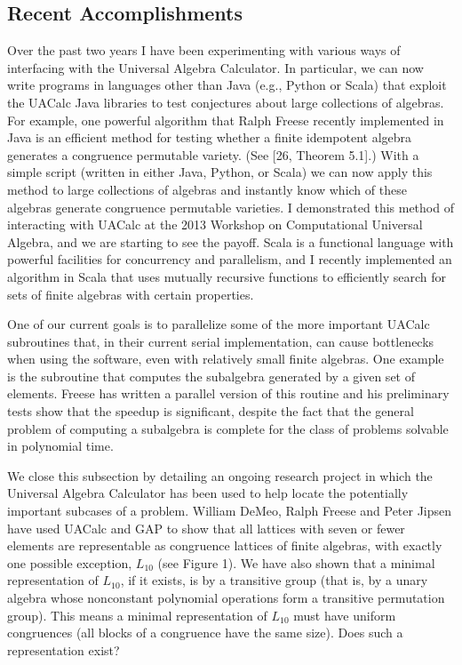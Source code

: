 \subsection{Recent Accomplishments}
Over the past two years I have been experimenting with various
ways of interfacing with the Universal Algebra Calculator.
In particular, we can now write programs in languages other than Java
(e.g., Python or Scala) that exploit the UACalc Java libraries to test conjectures
about large collections of algebras.
For example, one powerful algorithm that Ralph Freese recently implemented in Java is
an efficient method for testing whether a finite idempotent algebra generates a congruence
permutable variety. (See [26, Theorem 5.1].)
With a simple script (written in either Java, Python, or Scala) we can now apply this
method to large collections of algebras and instantly know which of these algebras generate
congruence permutable varieties.
I demonstrated this method of interacting with UACalc at the 2013 Workshop
on Computational Universal Algebra, and we are starting to see
the payoff.
Scala is a functional language with powerful facilities for concurrency and parallelism, and I
recently implemented an algorithm in Scala that uses mutually recursive functions to efficiently
search for sets of finite algebras with certain properties.

One of our current goals is to parallelize some of the more important
UACalc subroutines that, in their current serial implementation, can cause bottlenecks when using
the software, even with relatively small finite algebras. One example is the subroutine that computes
the subalgebra generated by a given set of elements. Freese has written a parallel version of
this routine and his preliminary tests show that the speedup is significant, despite the fact that
the general problem of computing a subalgebra is complete for the class of problems solvable in
polynomial time.

We close this subsection by detailing an ongoing research project in which the Universal Algebra
Calculator has been used to help locate the potentially important subcases of a problem.
William DeMeo, Ralph Freese and Peter Jipsen have used UACalc and GAP to show that all
lattices with seven or fewer elements are representable as congruence lattices of finite algebras, with
exactly one possible exception, $L_{10}$ (see Figure 1). We have also shown that a minimal
representation of $L_{10}$, if it exists, is by a transitive group (that is, by a unary algebra
whose nonconstant polynomial operations form a transitive permutation group). This means a minimal
representation of $L_{10}$ must have uniform congruences (all blocks of a congruence have the same
size). Does such a representation exist?

